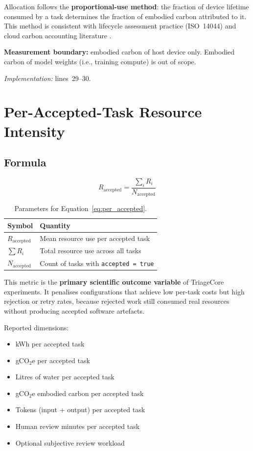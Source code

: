 \documentclass[12pt]{article}
\begin{document}
Allocation follows the \textbf{proportional-use method}: the fraction of device
lifetime consumed by a task determines the fraction of embodied carbon
attributed to it. This method is consistent with lifecycle assessment practice
(ISO~14044) and cloud carbon accounting literature \citep{lannelongue2021}.

\textbf{Measurement boundary:} embodied carbon of host device only. Embodied
carbon of model weights (i.e., training compute) is out of scope.

\textit{Implementation:} lines~29--30.

\section{Per-Accepted-Task Resource Intensity}

\subsection*{Formula}

\begin{equation}
  R_{\text{accepted}} = \frac{\displaystyle\sum_{i} R_i}{N_{\text{accepted}}}
  \label{eq:per_accepted}
\end{equation}

\begin{table}[h!]
\centering
\begin{tabular}{@{}ll@{}}
\toprule
Symbol & Quantity \\
\midrule
$R_{\text{accepted}}$ & Mean resource use per accepted task \\
$\sum R_i$            & Total resource use across all tasks \\
$N_{\text{accepted}}$ & Count of tasks with \texttt{accepted = true} \\
\bottomrule
\end{tabular}
\caption{Parameters for Equation~\ref{eq:per_accepted}.}
\end{table}

This metric is the \textbf{primary scientific outcome variable} of TriageCore
experiments. It penalises configurations that achieve low per-task costs but
high rejection or retry rates, because rejected work still consumed real
resources without producing accepted software artefacts.

\noindent Reported dimensions:
\begin{itemize}
  \item kWh per accepted task
  \item gCO$_2$e per accepted task
  \item Litres of water per accepted task
  \item gCO$_2$e embodied carbon per accepted task
  \item Tokens (input + output) per accepted task
  \item Human review minutes per accepted task
  \item Optional subjective review workload
\end{itemize}
\end{document}
